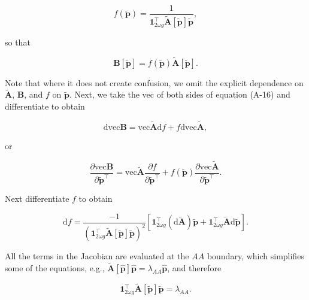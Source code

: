 \documentclass[11pt]{article}
\def\mbf#1{\mathbf{#1}}
\begin{document}
\begin{equation}
	f(\tilde{\mbf{p}}) = \frac{1}{ \mbf{1}^{\intercal}_{2 \omega g} \tilde{\mbf{A}}[\tilde{\mbf{p}}] \tilde{\mbf{p}}},
\end{equation}

\noindent so that

\begin{equation}
	\mbf{B}[\tilde{\mbf{p}}] = f(\tilde{\mbf{p}}) \tilde{\mbf{A}}[\tilde{\mbf{p}}].
\end{equation}

\noindent Note that where it does not create confusion, we omit the explicit dependence on $\tilde{\mbf{A}}$, $\mbf{B}$, and $f$ on $\tilde{\mbf{p}}$. Next, we take the vec of both sides of equation (A-16) and differentiate to obtain

\begin{equation} \label{eq:dvecB}
	\text{dvec} \mbf{B} = \text{vec} \tilde{\mbf{A}} \text{d} f + f \text{dvec} \tilde{\mbf{A}},
\end{equation}

\noindent or

\begin{equation}
	\frac{\partial \text{vec} \mbf{B}} {\partial \tilde{\mbf{p}}^{\intercal}} = \text{vec} \tilde{\mbf{A}} \frac{\partial f}{\partial \tilde{\mbf{p}}^{\intercal} } + f(\tilde{\mbf{p}}) \frac{ \partial \text{vec} \tilde{\mbf{A}} }{ \partial \tilde{\mbf{p}}^{\intercal} }.
\end{equation}

\noindent Next differentiate $f$ to obtain

\begin{equation}
	\text{d} f = \frac{ -1 }{ \left( \mbf{1}^{\intercal}_{2 \omega g} \tilde{\mbf{A}}[\tilde{\mbf{p}}] \tilde{\mbf{p}} \right)^2 } \left[ \mbf{1}^{\intercal}_{2 \omega g} \left( \text{d} \tilde{\mbf{A}} \right) \tilde{\mbf{p}} + \mbf{1}^{\intercal}_{2 \omega g} \tilde{\mbf{A}} \text{d} \tilde{\mbf{p}} \right].
\end{equation}

\noindent All the terms in the Jacobian are evaluated at the $AA$ boundary, which simplifies some of the equations, e.g., $\tilde{\mbf{A}}[ \hat{\mbf{p}} ] \hat{\mbf{p}} = \lambda_{AA} \hat{\mbf{p}}$, and therefore 

\begin{equation} \label{eq:lambdaAA}
	\mbf{1}^{\intercal}_{2 \omega g} \tilde{\mbf{A}}[\tilde{\mbf{p}}] \tilde{\mbf{p}} = \lambda_{AA}.
\end{equation}
\end{document}
